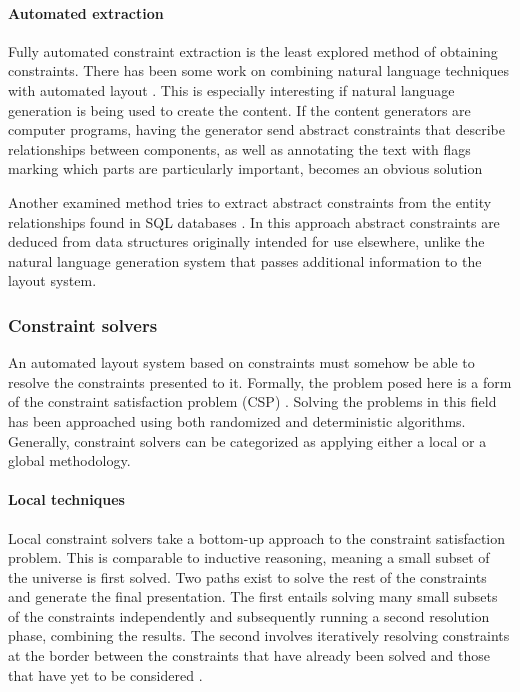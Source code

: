      \paragraph{Automated extraction}

      Fully automated constraint extraction is the least explored method of
      obtaining constraints. There has been some work on combining natural
      language techniques with automated layout \citep{roth-2}. This is
      especially interesting if natural language generation is being used to
      create the content. If the content generators are computer programs,
      having the generator send abstract constraints that describe
      relationships between components, as well as annotating the text with
      flags marking which parts are particularly important, becomes an obvious
      solution

      Another examined method tries to extract abstract constraints from the
      entity relationships found in SQL databases \citep{pizano-1}. In this
      approach abstract constraints are deduced from data structures originally
      intended for use elsewhere, unlike the natural language generation
      system that passes additional information to the layout system.

    \subsubsection{Constraint solvers}

     An automated layout system based on constraints must somehow be able to
     resolve the constraints presented to it. Formally, the problem posed here
     is a form of the constraint satisfaction problem (CSP)
     \citep{mackworth-2,mackworth-1}. Solving the problems in this field has
     been approached using both randomized and deterministic algorithms.
     Generally, constraint solvers can be categorized as applying either a
     local or a global methodology.

     \paragraph{Local techniques}

      Local constraint solvers take a bottom-up approach to the constraint
      satisfaction problem. This is comparable to inductive reasoning, meaning
      a small subset of the universe is first solved. Two paths exist to solve
      the rest of the constraints and generate the final presentation. The
      first entails solving many small subsets of the constraints independently
      and subsequently running a second resolution phase, combining the
      results. The second involves iteratively resolving constraints at the
      border between the constraints that have already been solved and those
      that have yet to be considered \citep{nilsson-1}.

